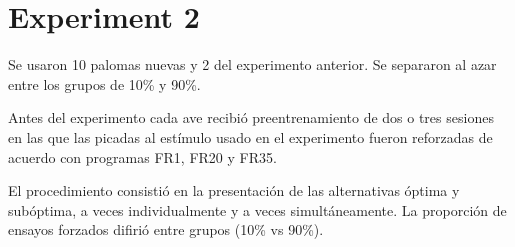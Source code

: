 \documentclass[a4paper,12pt]{article}
\begin{document}
\section{Experiment 2}

Se usaron 10 palomas nuevas y 2 del experimento anterior.
Se separaron al azar entre los grupos de 10\% y 90\%.

Antes del experimento cada ave recibió preentrenamiento de dos o tres sesiones en las que las picadas al estímulo usado en el experimento fueron reforzadas de acuerdo con programas FR1, FR20 y FR35.

El procedimiento consistió en la presentación de las alternativas óptima y subóptima, a veces individualmente y a veces simultáneamente.
La proporción de ensayos forzados difirió entre grupos (10\% vs 90\%).
\end{document}
